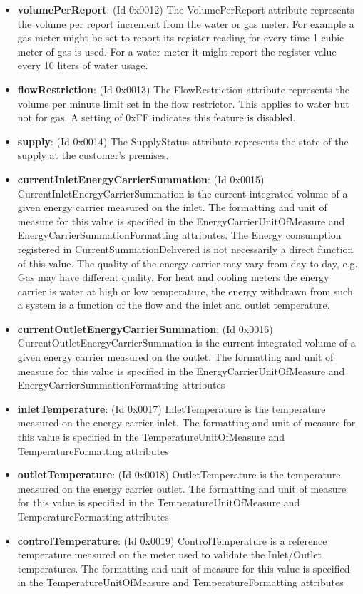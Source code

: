 \begin{itemize}
\item \textbf{volumePerReport}: (Id 0x0012) The VolumePerReport attribute represents the volume per report increment from the water or gas meter. For example a gas meter might be set to report its register reading for every time 1 cubic meter of gas is used. For a water meter it might report the register value every 10 liters of water usage.
\item \textbf{flowRestriction}: (Id 0x0013) The FlowRestriction attribute represents the volume per minute limit set in the flow restrictor. This applies to water but not for gas. A setting of 0xFF indicates this feature is disabled.
\item \textbf{supply}: (Id 0x0014) The SupplyStatus attribute represents the state of the supply at the customer's premises.
\item \textbf{currentInletEnergyCarrierSummation}: (Id 0x0015) CurrentInletEnergyCarrierSummation is the current integrated volume of a given energy carrier measured on the inlet. The formatting and unit of measure for this value is specified in the EnergyCarrierUnitOfMeasure and EnergyCarrierSummationFormatting attributes. The Energy consumption registered in CurrentSummationDelivered is not necessarily a direct function of this value. The quality of the energy carrier may vary from day to day, e.g. Gas may have different quality. For heat and cooling meters the energy carrier is water at high or low temperature, the energy withdrawn from such a system is a function of the flow and the inlet and outlet temperature.
\item \textbf{currentOutletEnergyCarrierSummation}: (Id 0x0016) CurrentOutletEnergyCarrierSummation is the current integrated volume of a given energy carrier measured on the outlet. The formatting and unit of measure for this value is specified in the EnergyCarrierUnitOfMeasure and EnergyCarrierSummationFormatting attributes
\item \textbf{inletTemperature}: (Id 0x0017) InletTemperature is the temperature measured on the energy carrier inlet. The formatting and unit of measure for this value is specified in the TemperatureUnitOfMeasure and TemperatureFormatting attributes
\item \textbf{outletTemperature}: (Id 0x0018) OutletTemperature is the temperature measured on the energy carrier outlet. The formatting and unit of measure for this value is specified in the TemperatureUnitOfMeasure and TemperatureFormatting attributes
\item \textbf{controlTemperature}: (Id 0x0019) ControlTemperature is a reference temperature measured on the meter used to validate the Inlet/Outlet temperatures. The formatting and unit of measure for this value is specified in the TemperatureUnitOfMeasure and TemperatureFormatting attributes

\end{itemize}
